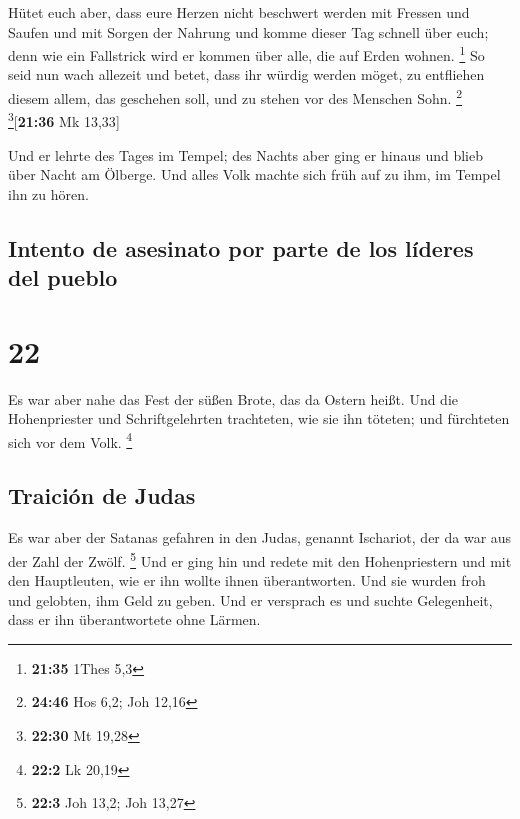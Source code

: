  Hütet euch aber, dass eure Herzen nicht beschwert werden
mit Fressen und Saufen und mit Sorgen der Nahrung und komme dieser Tag
schnell über euch;  denn wie ein Fallstrick wird er
kommen über alle, die auf Erden wohnen. \footnote{\textbf{21:35} 1Thes
  5,3}  So seid nun wach allezeit und betet, dass ihr
würdig werden möget, zu entfliehen diesem allem, das geschehen soll, und
zu stehen vor des Menschen Sohn. \footnote{\textbf{24:46} Hos 6,2; Joh
  12,16} \footnote{\textbf{22:30} Mt 19,28}{[}\textbf{21:36} Mk 13,33{]}

 Und er lehrte des Tages im Tempel; des Nachts aber ging
er hinaus und blieb über Nacht am Ölberge.  Und alles
Volk machte sich früh auf zu ihm, im Tempel ihn zu hören.

\hypertarget{intento-de-asesinato-por-parte-de-los-luxedderes-del-pueblo}{%
\subsection{Intento de asesinato por parte de los líderes del
pueblo}\label{intento-de-asesinato-por-parte-de-los-luxedderes-del-pueblo}}

\hypertarget{section-21}{%
\section{22}\label{section-21}}

 Es war aber nahe das Fest der süßen Brote, das da Ostern
heißt.  Und die Hohenpriester und Schriftgelehrten
trachteten, wie sie ihn töteten; und fürchteten sich vor dem Volk.
\footnote{\textbf{22:2} Lk 20,19}

\hypertarget{traiciuxf3n-de-judas}{%
\subsection{Traición de Judas}\label{traiciuxf3n-de-judas}}

 Es war aber der Satanas gefahren in den Judas, genannt
Ischariot, der da war aus der Zahl der Zwölf. \footnote{\textbf{22:3}
  Joh 13,2; Joh 13,27}  Und er ging hin und redete mit den
Hohenpriestern und mit den Hauptleuten, wie er ihn wollte ihnen
überantworten.  Und sie wurden froh und gelobten, ihm Geld
zu geben.  Und er versprach es und suchte Gelegenheit,
dass er ihn überantwortete ohne Lärmen.

